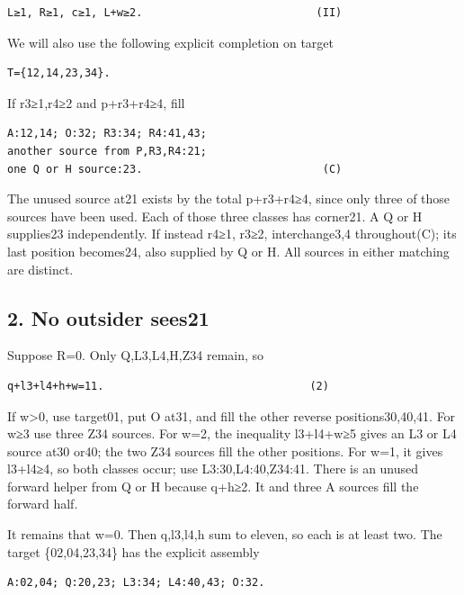 \documentclass[
  10pt,
]{article}
\begin{document}
\begin{verbatim}
L≥1, R≥1, c≥1, L+w≥2.                           (II)
\end{verbatim}

We will also use the following explicit completion on target

\begin{verbatim}
T={12,14,23,34}.
\end{verbatim}

If r3≥1,r4≥2 and p+r3+r4≥4, fill

\begin{verbatim}
A:12,14; O:32; R3:34; R4:41,43;
another source from P,R3,R4:21;
one Q or H source:23.                            (C)
\end{verbatim}

The unused source at21 exists by the total p+r3+r4≥4, since only three
of those sources have been used. Each of those three classes has
corner21. A Q or H supplies23 independently. If instead r4≥1, r3≥2,
interchange3,4 throughout(C); its last position becomes24, also supplied
by Q or H. All sources in either matching are distinct.

\hypertarget{no-outsider-sees21}{%
\subsection*{2. No outsider sees21}\label{no-outsider-sees21}}

Suppose R=0. Only Q,L3,L4,H,Z34 remain, so

\begin{verbatim}
q+l3+l4+h+w=11.                                (2)
\end{verbatim}

If w\textgreater0, use target01, put O at31, and fill the
other reverse positions30,40,41. For w≥3 use three Z34 sources. For w=2,
the inequality l3+l4+w≥5 gives an L3 or L4 source at30 or40; the two Z34
sources fill the other positions. For w=1, it gives l3+l4≥4, so both
classes occur; use L3:30,L4:40,Z34:41. There is an unused forward helper
from Q or H because q+h≥2. It and three A sources fill the forward half.

It remains that w=0. Then q,l3,l4,h sum to eleven, so each is at least
two. The target \{02,04,23,34\} has the explicit assembly

\begin{verbatim}
A:02,04; Q:20,23; L3:34; L4:40,43; O:32.
\end{verbatim}
\end{document}
